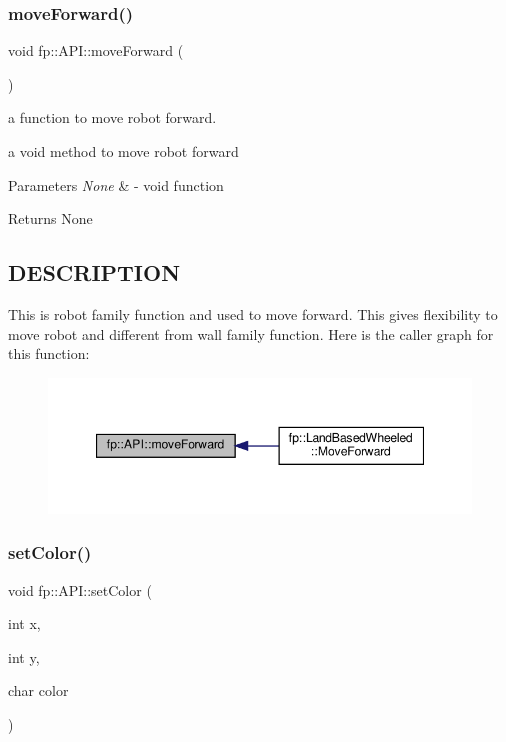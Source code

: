 \subsubsection{\texorpdfstring{move\+Forward()}{moveForward()}}
{\footnotesize\ttfamily void fp\+::\+A\+P\+I\+::move\+Forward (\begin{DoxyParamCaption}{ }\end{DoxyParamCaption})\hspace{0.3cm}{\ttfamily [static]}}



a function to move robot forward. 

a void method to move robot forward


\begin{DoxyParams}{Parameters}
{\em None} & -\/ void function \\
\hline
\end{DoxyParams}
\begin{DoxyReturn}{Returns}
None 
\end{DoxyReturn}
\hypertarget{_m_a_z_e_8h_DESCRIPTION}{}\subsection{D\+E\+S\+C\+R\+I\+P\+T\+I\+ON}\label{_m_a_z_e_8h_DESCRIPTION}
This is robot family function and used to move forward. This gives flexibility to move robot and different from wall family function. Here is the caller graph for this function\+:
\nopagebreak
\begin{figure}[H]
\begin{center}
\leavevmode
\includegraphics[width=347pt]{classfp_1_1_a_p_i_a4863c0dec23d677c5eefb7c03088b29c_icgraph}
\end{center}
\end{figure}
\mbox{\label{classfp_1_1_a_p_i_a5a7c59cffb4ca483e8c1334a99a04dbb}} 
\subsubsection{\texorpdfstring{set\+Color()}{setColor()}}
{\footnotesize\ttfamily void fp\+::\+A\+P\+I\+::set\+Color (\begin{DoxyParamCaption}\item[{int}]{x,  }\item[{int}]{y,  }\item[{char}]{color }\end{DoxyParamCaption})\hspace{0.3cm}{\ttfamily [static]}}



